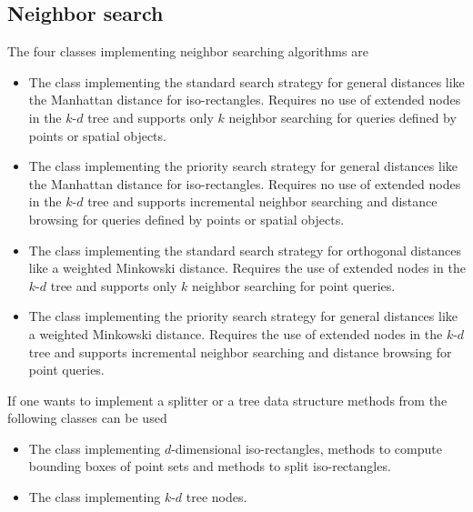\subsection{Neighbor search}

The four classes implementing neighbor searching algorithms are

\begin{itemize}

\item
The class  
implementing the standard search strategy for general distances
like the Manhattan distance for iso-rectangles.
Requires no use of extended nodes in the $k$-$d$ tree and supports only $k$
neighbor searching for queries defined by points or spatial objects.


\item
The class  implementing the priority search 
strategy for general distances
like the Manhattan distance for iso-rectangles.
Requires no use of extended nodes in the $k$-$d$ tree and supports incremental
neighbor searching and distance browsing for queries defined by points or spatial objects.

\item
The class  implementing the standard search strategy for 
orthogonal distances
like a weighted Minkowski distance. Requires the use of extended nodes in the $k$-$d$ tree and supports 
only $k$ neighbor searching for point queries.

\item
The class  implementing the priority search strategy for general 
distances
like a weighted Minkowski distance. Requires the use of extended nodes in the $k$-$d$ tree and supports incremental
neighbor searching and distance browsing for point queries.

\end{itemize}

If one wants to implement a splitter or a tree data structure
methods from the following classes can be used

\begin{itemize}

\item
The class  implementing $d$-dimensional iso-rectangles, 
methods to compute bounding boxes
of point sets and methods to split iso-rectangles.

\item
The class  implementing $k$-$d$ tree nodes.

\end{itemize}

